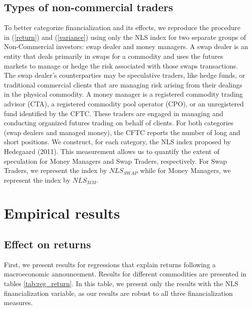 \documentclass[12pt]{article}
\begin{document}
\subsection{Types of non-commercial traders}
To better categorize financialization and its effects, we reproduce the procedure in (\ref{return})  and (\ref{variance}) using only the NLS index for two separate groups of Non-Commercial investors: swap dealer and money managers. A swap dealer is an entity that deals primarily in swaps for a commodity and uses the futures markets to manage or hedge the risk associated with those swaps transactions. The swap dealer’s counterparties may be speculative traders, like hedge funds, or traditional commercial clients that are managing risk arising from their dealings in the physical commodity. A money manager is a registered commodity trading advisor (CTA), a registered commodity pool operator (CPO), or an unregistered fund identified by the CFTC. These traders are engaged in managing and conducting organized futures trading on behalf of clients. For both categories (swap dealers and managed money), the CFTC reports the number of long and short positions. We construct, for each category, the NLS index proposed by Hedegaard (2011). This measurement allows us to quantify the extent of speculation for Money Managers and Swap Traders, respectively. For Swap Traders, we represent the index by $NLS_{SWAP}$ while for Money Managers, we represent the index by $NLS_{MM}$.

\section{Empirical results} \label{sec:result}



\subsection{Effect on returns}
First, we present results for regressions that explain returns following a macroeconomic announcement. Results for different commodities are presented in tables \ref{tab:reg_return}. In this table, we present only the results with the NLS financialization variable, as our results are robust to all three financialization measures.
\end{document}
